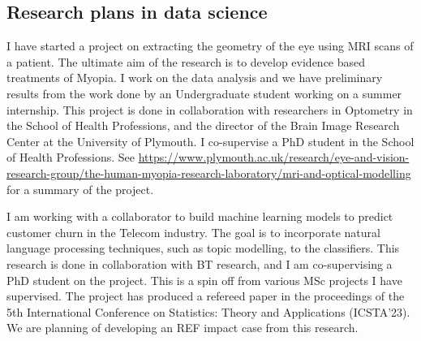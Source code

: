 \subsection{Research plans in data science}

I have started a project on extracting the geometry of the eye using
MRI scans of a patient. The ultimate aim of the research is to develop
evidence based treatments of Myopia. I work on the data analysis and
we have preliminary results from the work done by an Undergraduate
student working on a summer internship.  This project is done in
collaboration with researchers in Optometry in the School of Health
Professions, and the director of the Brain Image Research Center at
the University of Plymouth. I co-supervise a PhD student in the
School of Health Professions. See
\url{https://www.plymouth.ac.uk/research/eye-and-vision-research-group/the-human-myopia-research-laboratory/mri-and-optical-modelling}
for a
summary of the project.


I am working with a collaborator to build machine learning models to
predict customer churn in the Telecom industry.  The goal is to
incorporate natural language processing techniques, such as topic
modelling, to the classifiers.  This research is done in collaboration
with BT research, and I am co-supervising a PhD student on the
project.  This is a spin off from various MSc projects I have
supervised.  The project has produced a refereed paper in the
proceedings of the 5th International Conference on Statistics: Theory
and Applications (ICSTA’23). We are planning of developing an
REF impact case from this research.
